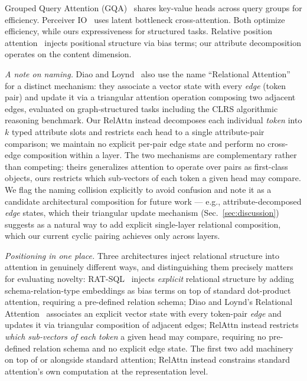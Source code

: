 \documentclass[review]{elsarticle}
\begin{document}
Grouped Query Attention (GQA)~\cite{ainslie2023gqa} shares key-value heads across query groups for efficiency. Perceiver IO~\cite{jaegle2022perceiver} uses latent bottleneck cross-attention. Both optimize efficiency, while ours expressiveness for structured tasks. Relative position attention~\cite{shaw2018selfattention} injects positional structure via bias terms; our attribute decomposition operates on the content dimension.

\emph{A note on naming.} Diao and Loynd~\cite{diao2023relational} also use the name ``Relational Attention'' for a distinct mechanism: they associate a vector state with every \emph{edge} (token pair) and update it via a triangular attention operation composing two adjacent edges, evaluated on graph-structured tasks including the CLRS algorithmic reasoning benchmark. Our RelAttn instead decomposes each individual \emph{token} into $k$ typed attribute slots and restricts each head to a single attribute-pair comparison; we maintain no explicit per-pair edge state and perform no cross-edge composition within a layer. The two mechanisms are complementary rather than competing: theirs generalizes attention to operate over pairs as first-class objects, ours restricts which sub-vectors of each token a given head may compare. We flag the naming collision explicitly to avoid confusion and note it as a candidate architectural composition for future work --- e.g., attribute-decomposed \emph{edge} states, which their triangular update mechanism (Sec.~\ref{sec:discussion}) suggests as a natural way to add explicit single-layer relational composition, which our current cyclic pairing achieves only across layers.

\emph{Positioning in one place.} Three architectures inject relational structure into attention in genuinely different ways, and distinguishing them precisely matters for evaluating novelty: RAT-SQL~\cite{qi2022rasat} injects \emph{explicit} relational structure by adding schema-relation-type embeddings as bias terms on top of standard dot-product attention, requiring a pre-defined relation schema; Diao and Loynd's Relational Attention~\cite{diao2023relational} associates an explicit vector state with every token-pair \emph{edge} and updates it via triangular composition of adjacent edges; RelAttn instead restricts \emph{which sub-vectors of each token} a given head may compare, requiring no pre-defined relation schema and no explicit edge state. The first two add machinery on top of or alongside standard attention; RelAttn instead constrains standard attention's own computation at the representation level.
\end{document}
